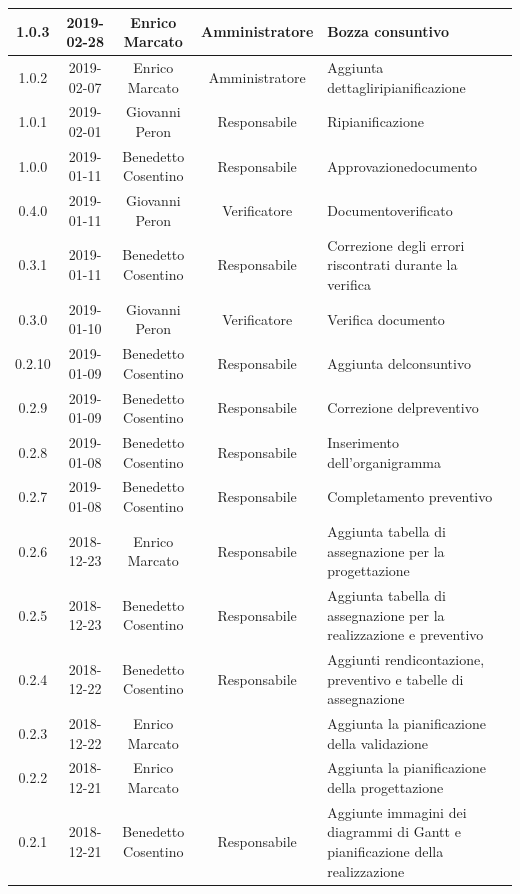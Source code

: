 \documentclass[11pt,a4paper]{article}
\begin{document}
{\begin{tabularx}{\textwidth}{ c | c | c | c | X }
		1.0.3 & 2019-02-28 & Enrico Marcato & Amministratore & Bozza consuntivo\\ \hline
		1.0.2 & 2019-02-07 & Enrico Marcato & Amministratore & Aggiunta dettagli\newline ripianificazione\\ \hline
		1.0.1 & 2019-02-01 & Giovanni Peron & Responsabile & Ripianificazione\\ \hline
		1.0.0 & 2019-01-11 & Benedetto Cosentino & Responsabile & Approvazione\newline documento\\ \hline
		0.4.0 & 2019-01-11 & Giovanni Peron & Verificatore & Documento\newline verificato\\ \hline
		0.3.1 & 2019-01-11 & Benedetto Cosentino & Responsabile & Correzione degli errori riscontrati durante la verifica \\ \hline
		0.3.0 & 2019-01-10 & Giovanni Peron & Verificatore & Verifica documento\\ \hline
		0.2.10 & 2019-01-09 & Benedetto Cosentino & Responsabile & Aggiunta del\newline consuntivo\\ \hline
		0.2.9 & 2019-01-09 & Benedetto Cosentino & Responsabile & Correzione del\newline preventivo\\ \hline
		0.2.8 & 2019-01-08 & Benedetto Cosentino & Responsabile & Inserimento dell'organigramma \\ \hline
		0.2.7 & 2019-01-08 & Benedetto Cosentino & Responsabile & Completamento preventivo \\ \hline	
		0.2.6 & 2018-12-23 & Enrico Marcato & Responsabile & Aggiunta tabella di assegnazione per la progettazione\\ \hline
		0.2.5 & 2018-12-23 & Benedetto Cosentino & Responsabile & Aggiunta tabella di assegnazione per la realizzazione e preventivo\\ \hline
		0.2.4 & 2018-12-22 & Benedetto Cosentino & Responsabile & Aggiunti rendicontazione, preventivo e tabelle di assegnazione \\ \hline
		0.2.3 & 2018-12-22 & Enrico Marcato &  & Aggiunta la pianificazione della validazione\\ \hline
		0.2.2 & 2018-12-21 & Enrico Marcato &  & Aggiunta la pianificazione della progettazione\\ \hline
		0.2.1 & 2018-12-21 & Benedetto Cosentino & Responsabile & Aggiunte immagini dei diagrammi di Gantt e pianificazione della realizzazione\\ \hline

\end{tabularx}}
\end{document}

